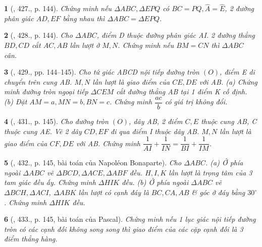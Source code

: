 \documentclass{article}
\newtheorem{baitoan}{}
\begin{document}
\begin{baitoan}[\cite{Binh_Toan_9_tap_2}, 427., p. 144]
	Chứng minh nếu $\Delta ABC,\Delta EPQ$ có $BC = PQ,\widehat{A} = \widehat{E}$, 2 đường phân giác $AD,EF$ bằng nhau thì $\Delta ABC = \Delta EPQ$.
\end{baitoan}

\begin{baitoan}[\cite{Binh_Toan_9_tap_2}, 428., p. 144]
	Cho $\Delta ABC$, điểm D thuộc đường phân giác AI. 2 đường thẳng $BD,CD$ cắt $AC,AB$ lần lượt ở $M,N$. Chứng minh nếu $BM = CN$ thì $\Delta ABC$ cân.
\end{baitoan}

\begin{baitoan}[\cite{Binh_Toan_9_tap_2}, 429., pp. 144--145]
	Cho tứ giác ABCD nội tiếp đường tròn $(O)$, điểm E di chuyển trên cung AB. $M,N$ lần lượt là giao điểm của $CE,DE$ với AB. (a) Chứng minh đường tròn ngoại tiếp $\Delta CEM$ cắt đường thẳng AB tại 1 điểm K cố định. (b) Đặt $AM = a,MN = b,BN = c$. Chứng minh $\dfrac{ac}{b}$ có giá trị không đổi.
\end{baitoan}

\begin{baitoan}[\cite{Binh_Toan_9_tap_2}, 431., p. 145]
	Cho đường tròn $(O)$, dây AB, 2 điểm $C,E$ thuộc cung AB, C thuộc cung AE. Vẽ 2 dây $CD,EF$ đi qua điểm I thuộc dây AB. $M,N$ lần lượt là giao điểm của $CF,DE$ với AB. Chứng minh $\dfrac{1}{AI} + \dfrac{1}{IN} = \dfrac{1}{BI} + \dfrac{1}{IM}$.
\end{baitoan}

\begin{baitoan}[\cite{Binh_Toan_9_tap_2}, 432., p. 145, bài toán của Napol\'eon Bonaparte]
	Cho $\Delta ABC$. (a) Ở phía ngoài $\Delta ABC$ vẽ $\Delta BCD,\Delta ACE,\Delta ABF$ đều. $H,I,K$ lần lượt là trọng tâm của 3 tam giác đều ấy. Chứng minh $\Delta HIK$ đều. (b) Ở phía ngoài $\Delta ABC$ vẽ $\Delta BCH,\Delta ACI$, $\Delta ABK$ lần lượt có cạnh đáy là $BC,CA,AB$ \& góc ở đáy bằng $30^\circ$. Chứng minh $\Delta HIK$ đều.
\end{baitoan}

\begin{baitoan}[\cite{Binh_Toan_9_tap_2}, 433., p. 145, bài toán của Pascal]
	Chứng minh nếu 1 lục giác nội tiếp đường tròn có các cạnh đối không song song thì giao điểm của các cặp cạnh đối là 3 điểm thẳng hàng.
\end{baitoan}


\printbibliography[heading=bibintoc]
\end{document}
